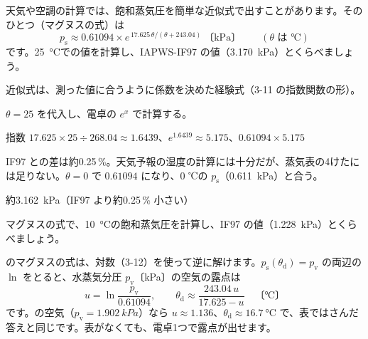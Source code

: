 \begin{reidai}
\label{ph:熱-9:ex13}天気や空調の計算では、飽和蒸気圧を簡単な近似式で出すことがあります。そのひとつ（マグヌスの式）は
\[ p_{\mathrm s}\approx0.61094\times e^{\,17.625\,\theta/(\theta+243.04)}\ \text{〔kPa〕}\qquad(\theta\text{ は ℃}) \]
です。\qty{25}{\celsius}での値を計算し、IAPWS-IF97 の値（\qty{3.170}{kPa}）とくらべましょう。
\par{} 近似式は、測った値に合うように係数を決めた経験式（3-11 の指数関数の形）。
\par\kangaekata $\theta=25$ を代入し、電卓の $e^x$ で計算する。
\par\shiki 指数 $17.625\times25\div268.04\approx1.6439$、$e^{1.6439}\approx5.175$、$0.61094\times5.175$
\par{} IF97 との差は約0.25\,\%。天気予報の湿度の計算には十分だが、蒸気表の4けたには足りない。$\theta=0$ で $0.61094$ になり、0 ℃の $p_{\mathrm s}$（\qty{0.611}{kPa}）と合う。
\par\kotae 約\qty{3.162}{kPa}（IF97 より約0.25\,\% 小さい）
\end{reidai}
\begin{jibun}
マグヌスの式で、\qty{10}{\celsius}の飽和蒸気圧を計算し、IF97 の値（\qty{1.228}{kPa}）とくらべましょう。
\end{jibun}

\begin{motto}[3]
のマグヌスの式は、対数（3-12）を使って逆に解けます。$p_{\mathrm s}(\theta_{\mathrm d})=p_{\mathrm v}$ の両辺の $\ln$ をとると、水蒸気分圧 $p_{\mathrm v}$〔kPa〕の空気の露点は
\[ u=\ln\frac{p_{\mathrm v}}{0.61094},\qquad \theta_{\mathrm d}\approx\frac{243.04\,u}{17.625-u}\quad\text{〔℃〕} \]
です。の空気（$p_{\mathrm v}=\qty{1.902}{kPa}$）なら $u\approx1.136$、$\theta_{\mathrm d}\approx\qty{16.7}{\celsius}$ で、表ではさんだ答えと同じです。表がなくても、電卓1つで露点が出せます。
\end{motto}


